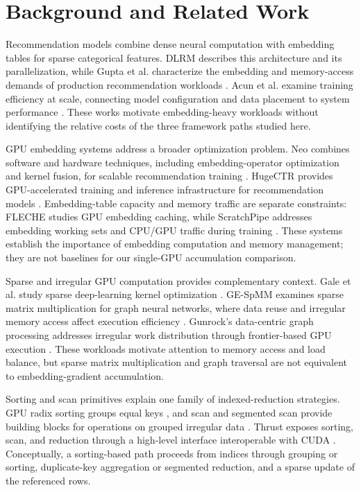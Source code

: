 \section{Background and Related Work}
\label{sec:background-related-work}

Recommendation models combine dense neural computation with embedding tables for sparse categorical features. DLRM describes this architecture and its parallelization, while Gupta et al. characterize the embedding and memory-access demands of production recommendation workloads \citep{naumov2019dlrm,gupta2020architectural}. Acun et al. examine training efficiency at scale, connecting model configuration and data placement to system performance \citep{acun2021training}. These works motivate embedding-heavy workloads without identifying the relative costs of the three framework paths studied here.

GPU embedding systems address a broader optimization problem. Neo combines software and hardware techniques, including embedding-operator optimization and kernel fusion, for scalable recommendation training \citep{mudigere2022neo}. HugeCTR provides GPU-accelerated training and inference infrastructure for recommendation models \citep{wang2022hugectr}. Embedding-table capacity and memory traffic are separate constraints: FLECHE studies GPU embedding caching, while ScratchPipe addresses embedding working sets and CPU/GPU traffic during training \citep{xie2022fleche,kwon2022scratchpipe}. These systems establish the importance of embedding computation and memory management; they are not baselines for our single-GPU accumulation comparison.

Sparse and irregular GPU computation provides complementary context. Gale et al. study sparse deep-learning kernel optimization \citep{gale2020sparse}. GE-SpMM examines sparse matrix multiplication for graph neural networks, where data reuse and irregular memory access affect execution efficiency \citep{huang2020gespmm}. Gunrock's data-centric graph processing addresses irregular work distribution through frontier-based GPU execution \citep{wang2016gunrock}. These workloads motivate attention to memory access and load balance, but sparse matrix multiplication and graph traversal are not equivalent to embedding-gradient accumulation.

Sorting and scan primitives explain one family of indexed-reduction strategies. GPU radix sorting groups equal keys \citep{satish2009sorting}, and scan and segmented scan provide building blocks for operations on grouped irregular data \citep{sengupta2007scan}. Thrust exposes sorting, scan, and reduction through a high-level interface interoperable with CUDA \citep{bell2011thrust}. Conceptually, a sorting-based path proceeds from indices through grouping or sorting, duplicate-key aggregation or segmented reduction, and a sparse update of the referenced rows.

